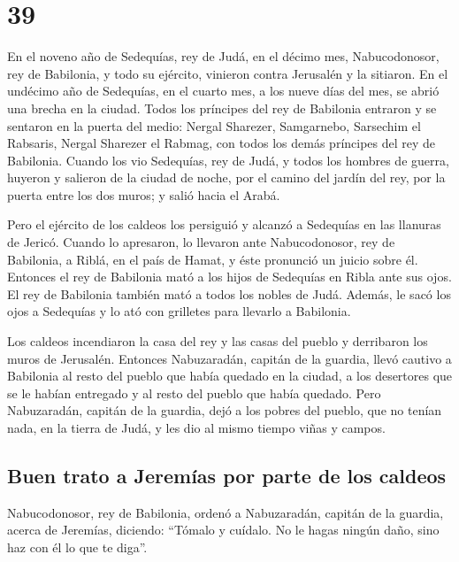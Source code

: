 \hypertarget{section-38}{%
\section{39}\label{section-38}}

 En el noveno año de Sedequías, rey de Judá, en el décimo
mes, Nabucodonosor, rey de Babilonia, y todo su ejército, vinieron
contra Jerusalén y la sitiaron.  En el undécimo año de
Sedequías, en el cuarto mes, a los nueve días del mes, se abrió una
brecha en la ciudad.  Todos los príncipes del rey de
Babilonia entraron y se sentaron en la puerta del medio: Nergal
Sharezer, Samgarnebo, Sarsechim el Rabsaris, Nergal Sharezer el Rabmag,
con todos los demás príncipes del rey de Babilonia. 
Cuando los vio Sedequías, rey de Judá, y todos los hombres de guerra,
huyeron y salieron de la ciudad de noche, por el camino del jardín del
rey, por la puerta entre los dos muros; y salió hacia el Arabá.

 Pero el ejército de los caldeos los persiguió y alcanzó a
Sedequías en las llanuras de Jericó. Cuando lo apresaron, lo llevaron
ante Nabucodonosor, rey de Babilonia, a Riblá, en el país de Hamat, y
éste pronunció un juicio sobre él.  Entonces el rey de
Babilonia mató a los hijos de Sedequías en Ribla ante sus ojos. El rey
de Babilonia también mató a todos los nobles de Judá. 
Además, le sacó los ojos a Sedequías y lo ató con grilletes para
llevarlo a Babilonia.

 Los caldeos incendiaron la casa del rey y las casas del
pueblo y derribaron los muros de Jerusalén.  Entonces
Nabuzaradán, capitán de la guardia, llevó cautivo a Babilonia al resto
del pueblo que había quedado en la ciudad, a los desertores que se le
habían entregado y al resto del pueblo que había quedado.
 Pero Nabuzaradán, capitán de la guardia, dejó a los
pobres del pueblo, que no tenían nada, en la tierra de Judá, y les dio
al mismo tiempo viñas y campos.

\hypertarget{buen-trato-a-jeremuxedas-por-parte-de-los-caldeos}{%
\subsection{Buen trato a Jeremías por parte de los
caldeos}\label{buen-trato-a-jeremuxedas-por-parte-de-los-caldeos}}

 Nabucodonosor, rey de Babilonia, ordenó a Nabuzaradán,
capitán de la guardia, acerca de Jeremías, diciendo: 
``Tómalo y cuídalo. No le hagas ningún daño, sino haz con él lo que te
diga''.


